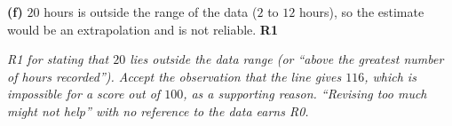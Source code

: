 \documentclass[12pt, twoside]{article}
\begin{document}
\begin{enumerate}[itemsep=0.3cm]
\textbf{(f)} $20$ hours is outside the range of the data ($2$ to $12$ hours),
so the estimate would be an extrapolation and is not reliable.
\hfill \textbf{R1}

\emph{R1 for stating that $20$ lies outside the data range (or ``above the
greatest number of hours recorded''). Accept the observation that the line
gives $116$, which is impossible for a score out of $100$, as a supporting
reason. ``Revising too much might not help'' with no reference to the data
earns R0.}

\end{enumerate}
\end{document}

